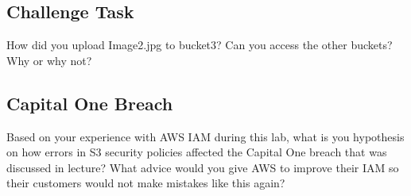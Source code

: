 \documentclass[11pt]{article}
\begin{document}
\subsection*{Challenge Task}
How did you upload Image2.jpg to bucket3? Can you access the other buckets? Why or why not?


\subsection*{Capital One Breach}
Based on your experience with AWS IAM during this lab, what is you hypothesis on how errors in S3 security policies affected the Capital One breach that was discussed in lecture? What advice would you give AWS to improve their IAM so their customers would not make mistakes like this again?
\end{document}
